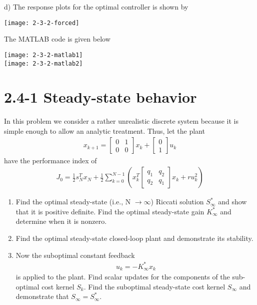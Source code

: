 \documentclass{article}
\begin{document}
  d) The response plots for the optimal controller is shown by
  \begin{center}
  \texttt{[image: 2-3-2-forced]}
  \end{center}
  
  The MATLAB code is given below
  \begin{center}
  \texttt{[image: 2-3-2-matlab1]} \\
  \texttt{[image: 2-3-2-matlab2]}
  \end{center}
  \newpage

  \section{2.4-1 Steady-state behavior}
  In this problem we consider a rather unrealistic discrete system because it is simple enough to allow an analytic treatment. Thus, let the plant
  \begin{align*}
	  x_{k+1}=
	  \begin{bmatrix}
		  0 & 1 \\
		  0 & 0 
	  \end{bmatrix}x_k+
	  \begin{bmatrix}
		  0 \\
		  1
	  \end{bmatrix}u_k
  \end{align*}
  have the performance index of
  \begin{align*}
	  J_0=\frac{1}{2}s_N^Tx_N+\frac{1}{2}\sum_{k=0}^{N-1}(x_k^T
	  \begin{bmatrix}
		  q_1 & q_2 \\
		  q_2 & q_1
	  \end{bmatrix}x_k+ru_k^2)
  \end{align*}
  \begin{enumerate}[label=(\alph*)]
	  \item Find the optimal steady-state (i.e., N $\rightarrow \infty$) Riccati solution $S_{\infty}^*$ and show that it is positive definite. Find the optimal steady-state gain $K_{\infty}^*$ 
		  and determine when it is nonzero.
	  \item Find the optimal steady-state closed-loop plant and demonstrate its stability.
	  \item Now the suboptimal constant feedback
		  \begin{align*}
			  u_k=-K_{\infty}^*x_k
		  \end{align*}
		  is applied to the plant. Find scalar updates for the components of the sub-optimal cost kernel $S_k$. Find the suboptimal steady-state cost kernel $S_{\infty}$ and demonstrate that 
		  $S_{\infty}=S_{\infty}^*$.
  \end{enumerate}
\end{document}
